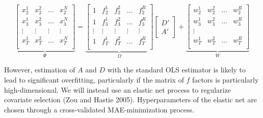 \documentclass[11pt, letterpaper]{article}\usepackage[]{graphicx}\usepackage[]{color}
\begin{document}
\begin{equation}
\underbrace{\begin{bmatrix}
x^1_{2} & x^2_{2} & \dots & x^N_{2}\\
x^1_{3} & x^2_{3} & \dots & x^N_{3}\\
\vdots & \vdots & \vdots & \vdots \\
x^1_{T} & x^2_{T} & \dots & x^N_{T}\\
\end{bmatrix}}_{\Phi}
=
\underbrace{\begin{bmatrix}
1 & f^1_{2} & f^2_{2} & \dots & f^R_{2}\\
1 & f^1_{3} & f^2_{3} & \dots & f^R_{3}\\
\vdots & \vdots & \vdots & \vdots & \vdots \\
1 & f^1_{T} & f^2_{T} & \dots & f^R_{T}\\
\end{bmatrix}}_{\Omega}
\begin{bmatrix}
D'\\
A'
\end{bmatrix}
 +
\underbrace{\begin{bmatrix}
w^1_2 & w^2_2 & \dots & w^R_2\\
w^1_3 & w^2_3 & \dots & w^R_3\\
\vdots\\
w^1_T & w^2_T & \dots & w^R_T\\
\end{bmatrix}}_{W}
\end{equation}

However, estimation of $A$ and $D$ with the standard OLS estimator is likely to lead to significant overfitting, particularly if the matrix of $f$ factors is particularly high-dimensional. We will instead use an elastic net process to regularize covariate selection (Zou and Hastie 2005). Hyperparameters of the elastic net are chosen through a cross-validated MAE-minimization process.
\end{document}
